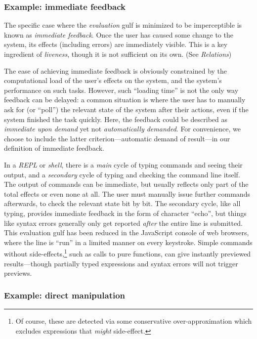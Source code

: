 \documentclass[english,submission]{programming}
\begin{document}
\hypertarget{example-immediate-feedback}{%
\subsubsection{Example: immediate
feedback}\label{example-immediate-feedback}}

The specific case where the \emph{evaluation} gulf is minimized to be
imperceptible is known as \emph{immediate feedback}. Once the user has
caused some change to the system, its effects (including errors) are
immediately visible. This is a key ingredient of \emph{liveness}, though
it is not sufficient on its own. (See \emph{Relations})

The ease of achieving immediate feedback is obviously constrained by the
computational load of the user's effects on the system, and the system's
performance on such tasks. However, such ``loading time'' is not the
only way feedback can be delayed: a common situation is where the user
has to manually ask for (or ``poll'') the relevant state of the system
after their actions, even if the system finished the task quickly. Here,
the feedback could be described as \emph{immediate upon demand} yet not
\emph{automatically demanded}. For convenience, we choose to include the
latter criterion---automatic demand of result---in our definition of
immediate feedback.

In a \emph{REPL} or \emph{shell}, there is a \emph{main} cycle of typing
commands and seeing their output, and a \emph{secondary} cycle of typing
and checking the command line itself. The output of commands can be
immediate, but usually reflects only part of the total effects or even
none at all. The user must manually issue further commands afterwards,
to check the relevant state bit by bit. The secondary cycle, like all
typing, provides immediate feedback in the form of character ``echo'',
but things like syntax errors generally only get reported \emph{after}
the entire line is submitted. This evaluation gulf has been reduced in
the JavaScript console of web browsers, where the line is ``run'' in a
limited manner on every keystroke. Simple commands without
side-effects,\footnote{Of course, these are detected via some
  conservative over-approximation which excludes expressions that
  \emph{might} side-effect.} such as calls to pure functions, can give
instantly previewed results---though partially typed expressions and
syntax errors will not trigger previews.

\hypertarget{example-direct-manipulation}{%
\subsubsection{Example: direct
manipulation}\label{example-direct-manipulation}}
\end{document}
